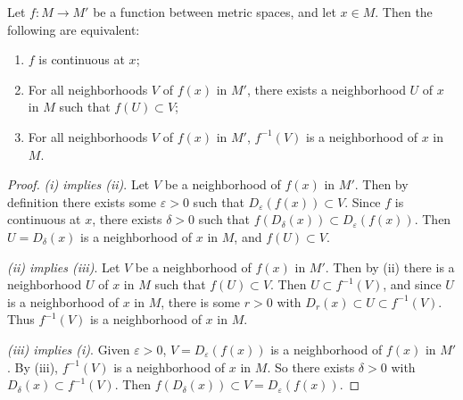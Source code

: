 \documentclass[a4paper]{scrartcl}
\begin{document}
\begin{proposition}
    Let $f: M \rightarrow M'$ be a function between metric spaces, and let $x \in M$. Then the following are equivalent:
    \begin{enumerate}[label=(\roman*)]
        \item $f$ is continuous at $x$;
        \item For all neighborhoods $V$ of $f(x)$ in $M'$, there exists a neighborhood $U$ of $x$ in $M$ such that $f(U) \subset V$;
        \item For all neighborhoods $V$ of $f(x)$ in $M'$, $f^{-1}(V)$ is a neighborhood of $x$ in $M$.
    \end{enumerate}
\end{proposition}
\begin{proof}
    \emph{(i) implies (ii)}. Let $V$ be a neighborhood of $f(x)$ in $M'$. Then by definition there exists some $\varepsilon > 0$ such that $D_{\varepsilon}(f(x)) \subset V$. Since $f$ is continuous at $x$, there exists $\delta > 0$ such that $f(D_{\delta}(x)) \subset D_\varepsilon(f(x))$. Then $U = D_{\delta}(x)$ is a neighborhood of $x$ in $M$, and $f(U) \subset V$.

    \emph{(ii) implies (iii)}. Let $V$ be a neighborhood of $f(x)$ in $M'$. Then by (ii) there is a neighborhood $U$ of $x$ in $M$ such that $f(U) \subset V$. Then $U \subset f^{-1}(V)$, and since $U$ is a neighborhood of $x$ in $M$, there is some $r > 0$ with $D_r(x) \subset U \subset f^{-1}(V)$. Thus $f^{-1}(V)$ is a neighborhood of $x$ in $M$.

    \emph{(iii) implies (i)}.
    Given $\varepsilon > 0$, $V = D_{\varepsilon}(f(x))$ is a neighborhood of $f(x)$ in $M'$. By (iii), $f^{-1}(V)$ is a neighborhood of $x$ in $M$. So there exists $\delta > 0$ with $D_{\delta}(x) \subset f^{-1}(V)$. Then $f(D_{\delta}(x)) \subset V = D_{\varepsilon}(f(x))$.
\end{proof}
\end{document}

